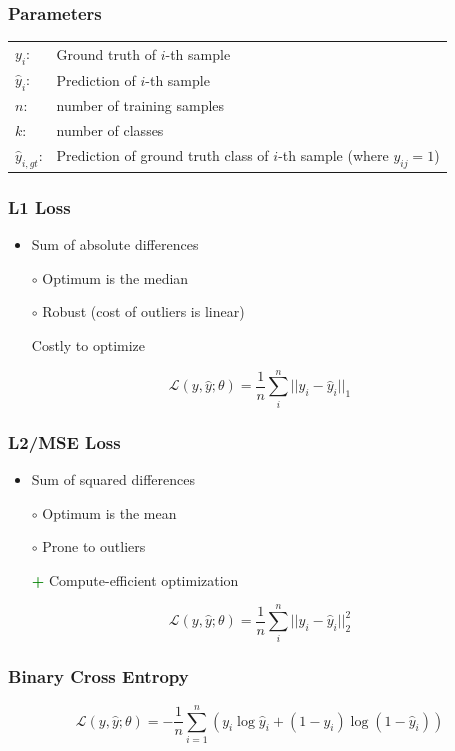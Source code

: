 \documentclass[10pt,a4paper]{article}
\newcommand{\cons}{\textcolor{red}{\textbf{\textendash}}}
\newcommand{\pros}{\textcolor{green}{\textbf{+}}}
\newcommand{\props}{$\circ$}
\begin{document}
\subsubsection{Parameters}
\begin{tabular}{ll}
	$y_i$: & Ground truth of $i$-th sample \\
	$\hat y_i$: & Prediction of $i$-th sample \\
	$n$: & number of training samples \\
	$k$: & number of classes \\
	$\hat y_{i, gt}$: & Prediction of ground truth class of $i$-th sample (where $y_{ij} = 1$)
\end{tabular}

\subsubsection{L1 Loss}
\begin{itemize}
	\item Sum of absolute differences
	\item[\props] Optimum is the median
	\item[\props] Robust (cost of outliers is linear)
	\item[\cons] Costly to optimize
	
\end{itemize}
$$
	\mathcal L(y, \hat y; \theta) = \frac 1 n \sum_i^n ||y_i - \hat y_i||_1
$$

\subsubsection{L2/MSE Loss}
\begin{itemize}
	\item Sum of squared differences
	\item[\props] Optimum is the mean
	\item[\props] Prone to outliers
	\item[\pros] Compute-efficient optimization
	
\end{itemize}
$$
	\mathcal L(y, \hat y; \theta) = \frac 1 n \sum_i^n ||y_i - \hat y_i||_2^2
$$

\subsubsection{Binary Cross Entropy}
$$
	\mathcal L(y, \hat y; \theta) = - \frac 1 n \sum_{i = 1}^n (y_i \log \hat y_i + (1 - y_i) \log(1 - \hat y_i))
$$
\end{document}
